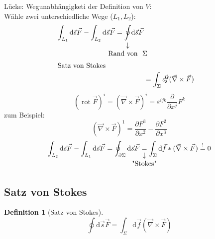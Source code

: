 \documentclass[a4paper]{scrartcl}
\DeclareMathOperator{\rot}{rot}
\renewcommand{\d}{\mathrm{d}}
\renewcommand{\v}[1]{\vec{#1}}
\theoremstyle{definition}
\newtheorem{defn}{Definition}
\theoremstyle{plain}
\theoremstyle{remark}
\begin{document}
Lücke: Wegunabhängigketi der Definition von $V$: \\
     Wähle zwei unterschiedliche Wege ($L_1, L_2$):
\begin{align*}
\int_{L_1}\d\v s \v F - \int_{L_2}\d \v s \v F = \underarrow[\oint]{\text{Rand von } $\Sigma$} \d\v s\v F \\
\intertext{Satz von Stokes}
&= \int_{\Sigma}\v{d f}(\v\nabla \times\v F)
\end{align*}
\[(\rot \v F)^i = (\v\nabla \times \v F)^i = \varepsilon^{ijk}\frac{\partial}{\partial x^j} F^k\]
zum Beispiel:
\[(\v\nabla\times\v F)^1 = \frac{\partial F^3}{\partial x^2} - \frac{\partial F^2}{\partial x^3}\]
\[\int_{L_2}\d \v s \v F - \int_{L_1}\d \v s\v F = \oint_{\partial \Sigma} \d\v s \v F \underarrow[=]{\text{"Stokes"}} \int_{\Sigma}\d\v f*(\v\nabla\times\v F) \overset{!}{=} 0\]
\subsection{Satz von Stokes}
\label{sec-4-4}
\begin{defn}[Satz von Stokes]
\[\oint \d \v s\v F = \int_{\Sigma} \d \v f (\v \nabla \times \v F)\]
\end{defn}
\end{document}
